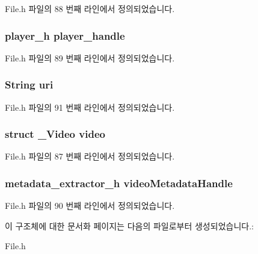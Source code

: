 File.\-h 파일의 88 번째 라인에서 정의되었습니다.

\hypertarget{struct___video_extends_acdbf0738be9fa70a60412d48cad881ee}{
\subsubsection[{player\-\_\-handle}]{\setlength{\rightskip}{0pt plus 5cm}player\-\_\-h player\-\_\-handle}}\label{struct___video_extends_acdbf0738be9fa70a60412d48cad881ee}


File.\-h 파일의 89 번째 라인에서 정의되었습니다.

\hypertarget{struct___video_extends_ac0b02717b928a36338653c49b0821365}{
\subsubsection[{uri}]{\setlength{\rightskip}{0pt plus 5cm}String uri}}\label{struct___video_extends_ac0b02717b928a36338653c49b0821365}


File.\-h 파일의 91 번째 라인에서 정의되었습니다.

\hypertarget{struct___video_extends_aa5784e2c1293cd9248e7bd28183fc1f8}{
\subsubsection[{video}]{\setlength{\rightskip}{0pt plus 5cm}struct {\bf \-\_\-\-Video} video}}\label{struct___video_extends_aa5784e2c1293cd9248e7bd28183fc1f8}


File.\-h 파일의 87 번째 라인에서 정의되었습니다.

\hypertarget{struct___video_extends_a0c761970ca029f0974eadbb58090641c}{
\subsubsection[{video\-Metadata\-Handle}]{\setlength{\rightskip}{0pt plus 5cm}metadata\-\_\-extractor\-\_\-h video\-Metadata\-Handle}}\label{struct___video_extends_a0c761970ca029f0974eadbb58090641c}


File.\-h 파일의 90 번째 라인에서 정의되었습니다.



이 구조체에 대한 문서화 페이지는 다음의 파일로부터 생성되었습니다.\-:\begin{DoxyCompactItemize}
\item 
File.\-h\end{DoxyCompactItemize}
